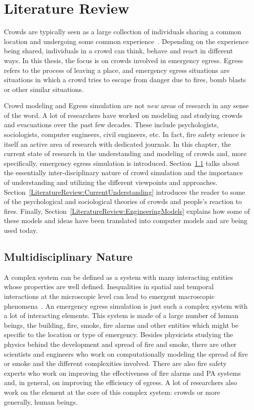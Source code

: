 
\chapter{Literature Review}
\label{chapter:LiteratureReview}

Crowds are typically seen as a large collection of individuals sharing a common location and undergoing some common experience~\cite{Aveni:1997wq}. Depending on the experience being shared, individuals in a crowd can think, behave and react in different ways. In this thesis, the focus is on crowds involved in emergency egress. Egress refers to the process of leaving a place, and emergency egress situations are situations in which a crowd tries to escape from danger due to fires, bomb blasts or other similar situations.

Crowd modeling and Egress simulation are not \emph{new} areas of research in any sense of the word. A lot of researchers have worked on modeling and studying crowds and evacuations over the past few decades. These include psychologists, sociologists, computer engineers, civil engineers, etc. In fact, fire safety science is itself an active area of research with dedicated journals. In this chapter, the current state of research in the understanding and modeling of crowds and, more specifically, emergency egress simulation is introduced. Section~\ref{LiteratureReiew:MultidisciplinaryNature} talks about the essentially inter-disciplinary nature of crowd simulation and the importance of understanding and utilizing the different viewpoints and approaches. Section~\ref{LiteratureReview:CurrentUnderstanding} introduces the reader to some of the psychological and sociological theories of crowds and people's reaction to fires. Finally, Section~\ref{LiteratureReview:EngineeringModels} explains how some of these models and ideas have been translated into computer models and are being used today.

\section{Multidisciplinary Nature}
\label{LiteratureReiew:MultidisciplinaryNature}
A complex system can be defined as a system with many interacting entities whose properties are well defined. Inequalities in spatial and temporal interactions at the microscopic level can lead to emergent macroscopic phenomena~\cite{Sloot:1997ws}. An emergency egress simulation is just such a complex system with a lot of interacting elements. This system is made of a large number of human beings, the building, fire, smoke, fire alarms and other entities which might be specific to the location or type of emergency. Besides physicists studying the physics behind the development and spread of fire and smoke, there are other scientists and engineers who work on computationally modeling the spread of fire or smoke and the different complexities involved. There are also fire safety experts who work on improving the effectiveness of fire alarms and PA systems and, in general, on improving the efficiency of egress. A lot of researchers also work on the element at the core of this complex system: crowds or more generally, human beings.

